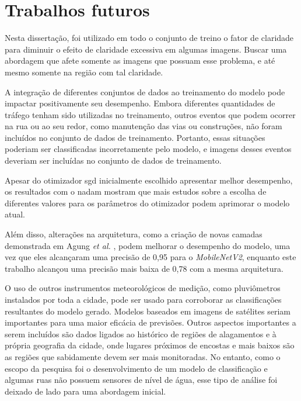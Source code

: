 \section{Trabalhos futuros}

Nesta dissertação, foi utilizado em todo o conjunto de treino o fator de claridade para diminuir o efeito de claridade excessiva em algumas imagens.
Buscar uma abordagem que afete somente as imagens que possuam esse problema, e até mesmo somente na região com tal claridade.

A integração de diferentes conjuntos de dados ao treinamento do modelo pode impactar positivamente seu desempenho.
Embora diferentes quantidades de tráfego tenham sido utilizadas no treinamento, outros eventos que podem ocorrer na rua ou ao seu redor, como manutenção das vias ou construções,
não foram incluídos no conjunto de dados de treinamento.
Portanto, essas situações poderiam ser classificadas incorretamente pelo modelo, e imagens desses eventos deveriam ser incluídas no conjunto de dados de treinamento.

Apesar do otimizador \acrshort{sgd} inicialmente escolhido apresentar melhor desempenho,
os resultados com o \acrshort{nadam} mostram que mais estudos sobre a escolha de diferentes valores para os parâmetros do otimizador podem aprimorar o modelo atual.

Além disso, alterações na arquitetura, como a criação de novas camadas demonstrada em Agung \textit{et al.} \cite{agung2023},
podem melhorar o desempenho do modelo, uma vez que eles alcançaram uma precisão de 0,95 para o \textit{MobileNetV2},
enquanto este trabalho alcançou uma precisão mais baixa de 0,78 com a mesma arquitetura.

O uso de outros instrumentos meteorológicos de medição, como pluviômetros instalados por toda a cidade, pode ser usado para corroborar as classificações resultantes do modelo gerado.
Modelos baseados em imagens de satélites seriam importantes para uma maior eficácia de previsões.
Outros aspectos importantes a serem incluídos são dados ligados ao histórico de regiões de alagamentos e à própria geografia da cidade, onde lugares próximos de encostas e mais baixos são as regiões que sabidamente devem ser mais monitoradas.
No entanto, como o escopo da pesquisa foi o desenvolvimento de um modelo de classificação e algumas ruas não possuem sensores de nível de água,
esse tipo de análise foi deixado de lado para uma abordagem inicial.
